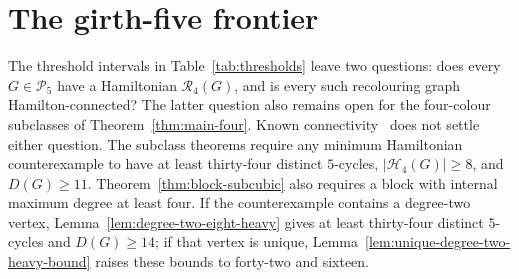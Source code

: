 \documentclass[11pt]{article}
\theoremstyle{remark}
\newcommand{\R}{\mathcal R}
\numberwithin{equation}{section}
\numberwithin{table}{section}
\begin{document}
\section{The girth-five frontier}\label{sec:girth-five-frontier}

The threshold intervals in Table~\ref{tab:thresholds} leave two
questions: does every $G\in\mathcal P_5$ have a Hamiltonian
$\R_4(G)$, and is every such recolouring graph Hamilton-connected?
The latter question also remains open for the four-colour subclasses
of Theorem~\ref{thm:main-four}. Known connectivity~\cite{BBFHMP23}
does not settle either question. The subclass theorems require
any minimum Hamiltonian counterexample to have at least thirty-four
distinct $5$-cycles, $|\mathcal H_4(G)|\ge8$, and $D(G)\ge11$.
Theorem~\ref{thm:block-subcubic} also requires a block with internal
maximum degree at least four. If the counterexample contains a
degree-two vertex, Lemma~\ref{lem:degree-two-eight-heavy} gives at
least thirty-four distinct $5$-cycles and $D(G)\ge14$; if that vertex
is unique, Lemma~\ref{lem:unique-degree-two-heavy-bound} raises these
bounds to forty-two and sixteen.
\end{document}
